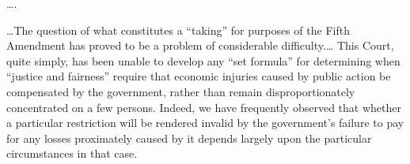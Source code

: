 


\ldots.



\ldots The question of what constitutes a ``taking'' for purposes of the Fifth
Amendment has proved to be a problem of considerable difficulty.\ldots
This Court, quite
simply, has been unable to develop any ``set formula'' for determining when
``justice and fairness'' require that economic injuries caused by public action
be compensated by the government, rather than remain disproportionately
concentrated on a few persons. Indeed, we have frequently observed that whether
a particular restriction will be rendered invalid by the government's failure to
pay for any losses proximately caused by it depends largely upon the
particular circumstances in that case.

